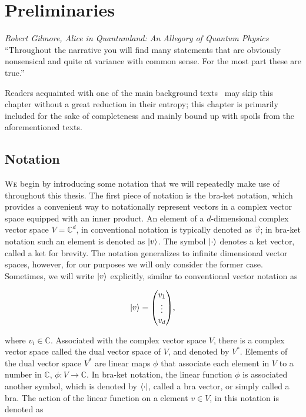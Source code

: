 \chapter{Preliminaries}

\begin{epigram}{\textit{Robert Gilmore, Alice in Quantumland: An Allegory of Quantum Physics}}
    \enquote{Throughout the narrative you will find many statements that are obviously nonsensical and quite at variance with common sense. For the most part these are true.}
\end{epigram}

\noindent
Readers acquainted with one of the main background texts~\cite{Mike&Ike, Dewolf_2019} may skip this chapter without a great reduction in their entropy; this chapter is primarily included for the sake of completeness and mainly bound up with spoils from the aforementioned texts.

\section{Notation}
\lettrine[lines=3]{W}{e} begin by introducing some notation that we will repeatedly make use of throughout this thesis. The first piece of notation is the bra-ket notation, which provides a convenient way to notationally represent vectors in a complex vector space equipped with an inner product. An element of a $d$-dimensional complex vector space $V=\mathbb{C}^{d}$, in conventional notation is typically denoted as $\vec{v}$; in bra-ket notation such an element is denoted as $\ket{v}$. The symbol $\ket{\cdot}$ denotes a ket vector, called a ket for brevity.  The notation generalizes to infinite dimensional vector spaces, however, for our purposes we will only consider the former case. Sometimes, we will write $\ket{v}$ explicitly, similar to conventional vector notation as

\begin{align}
    \ket{v} = \mqty(v_1 \\ \vdots \\ v_d),
\end{align}

\noindent
where $v_i \in \mathbb{C}$. Associated with the complex vector space $V$, there is a complex vector space called the dual vector space of $V$, and denoted by $V^{*}$. Elements of the dual vector space $V^{*}$ are linear maps $\phi$ that associate each element in $V$ to a number in $\mathbb{C}$, $\phi: V \to \mathbb{C}$. In bra-ket notation, the linear function $\phi$ is associated another symbol, which is denoted by $\bra{\cdot}$, called a bra vector, or simply called a bra. The action of the linear function on a element $v \in V$, in this notation is denoted as 

